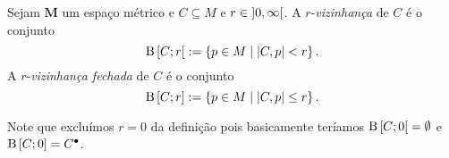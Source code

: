 \begin{definition}
Sejam $\bm M$ um espaço métrico e $C \subseteq M$ e $r \in \left]{0},{\infty}\right[$. A $r$-\emph{vizinhança} de $C$ é o conjunto
	\begin{equation*}
	\mathrm{B}\left[{C};{r}\right[ := \left\{{p \in M}\;\middle\vert\;{\left\vert{C},{p}\right\vert < r}\right\}.
	\end{equation*}
 A $r$-\emph{vizinhança fechada} de $C$ é o conjunto
	\begin{equation*}
	\mathrm{B}\left[{C};{r}\right] := \left\{{p \in M}\;\middle\vert\;{\left\vert{C},{p}\right\vert \leq r}\right\}.
	\end{equation*}
\end{definition}

Note que excluímos $r=0$ da definição pois basicamente teríamos $\mathrm{B}\left[{C};{0}\right[ = \emptyset$ e $\mathrm{B}\left[{C};{0}\right] = {C}^\bullet$.

